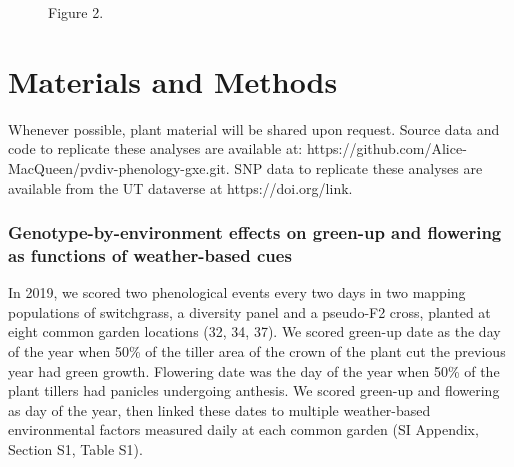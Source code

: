 \documentclass[
  9pt,
  twocolumn,
  twoside]{pnas-new}
\begin{document}
\begin{figure}


\caption{\label{fig-covar}Figure 2.}

\end{figure}%

\section{Materials and Methods}\label{materials-and-methods}

Whenever possible, plant material will be shared upon request. Source
data and code to replicate these analyses are available at:
https://github.com/Alice-MacQueen/pvdiv-phenology-gxe.git. SNP data to
replicate these analyses are available from the UT dataverse at
https://doi.org/link.

\subsubsection{Genotype-by-environment effects on green-up and flowering
as functions of weather-based
cues}\label{genotype-by-environment-effects-on-green-up-and-flowering-as-functions-of-weather-based-cues}

In 2019, we scored two phenological events every two days in two mapping
populations of switchgrass, a diversity panel and a pseudo-F2 cross,
planted at eight common garden locations (32, 34, 37). We scored
green-up date as the day of the year when 50\% of the tiller area of the
crown of the plant cut the previous year had green growth. Flowering
date was the day of the year when 50\% of the plant tillers had panicles
undergoing anthesis. We scored green-up and flowering as day of the
year, then linked these dates to multiple weather-based environmental
factors measured daily at each common garden (SI Appendix, Section S1,
Table S1).
\end{document}
